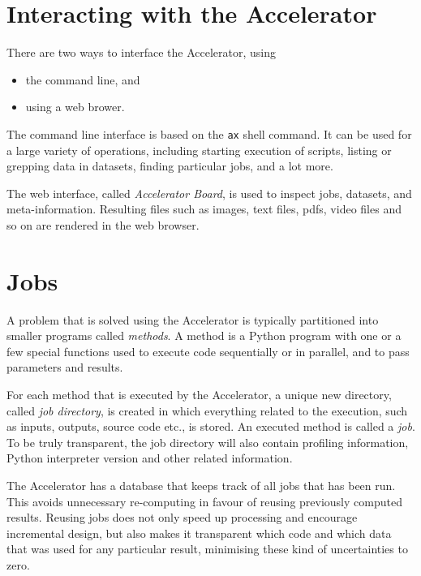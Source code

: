 \section{Interacting with the Accelerator}
There are two ways to interface the Accelerator, using
\begin{itemize}
\item[] the command line, and
\item[] using a web brower.
\end{itemize}
The command line interface is based on the \texttt{ax} shell command.
It can be used for a large variety of operations, including starting
execution of scripts, listing or grepping data in datasets, finding
particular jobs, and a lot more.

The web interface, called \textsl{Accelerator Board}, is used to
inspect jobs, datasets, and meta-information.  Resulting files such as
images, text files, pdfs, video files and so on are rendered in the
web browser.


\section{Jobs}
A problem that is solved using the Accelerator is typically
partitioned into smaller programs called \emph{methods}.  A method is
a Python program with one or a few special functions used to execute
code sequentially or in parallel, and to pass parameters and results.

For each method that is executed by the Accelerator, a unique new
directory, called \emph{job directory}, is created in which everything
related to the execution, such as inputs, outputs, source code etc.,
is stored.  An executed method is called a \emph{job}.  To be truly
transparent, the job directory will also contain profiling
information, Python interpreter version and other related information.

The Accelerator has a database that keeps track of all jobs that has
been run.  This avoids unnecessary re-computing in favour of reusing
previously computed results.  Reusing jobs does not only speed up
processing and encourage incremental design, but also makes it
transparent which code and which data that was used for any particular
result, minimising these kind of uncertainties to zero.


